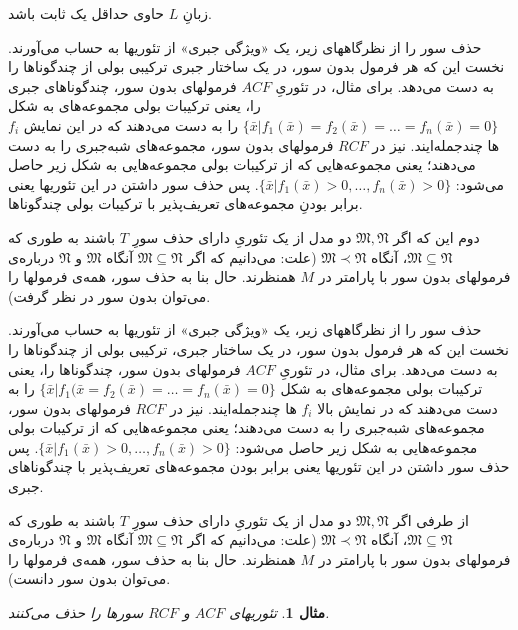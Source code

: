 \documentclass[12pt,a4paper]{report}
\theoremstyle{colorhead}
\newtheorem{mesal}[thm]{مثال}
\begin{document}
زبانِ
$L$
حاوی 
حداقل یک ثابت باشد.
\par 
حذف سور را از نظرگاههای زیر،
 یک «ویژگی جبری» از تئوریها به حساب می‌آورند.  نخست این که هر فرمول بدون سور، در یک ساختار جبری ترکیبی بولی 
 از چندگوناها 
 را به دست می‌دهد. برای مثال، در تئوریِ
  $ACF$
  فرمولهای 
  بدون سور، چندگوناهای جبری را، یعنی ترکیبات بولی مجموعه‌های به شکل
  $\{\bar{x}|f_1(\bar{x})=f_2(\bar{x})=\ldots=f_n(\bar{x})=0\}$
   را به دست می‌دهند که در این نمایش
  $f_i$
  ها چندجمله‌ایند. 
  نیز در
  $RCF$
  فرمولهای بدون سور، 
  مجموعه‌های شبه‌جبری 
  را به دست می‌دهند؛ یعنی مجموعه‌هایی که از ترکیبات بولی مجموعه‌هایی به شکل زیر حاصل می‌شود:
  $\{\bar{x}|f_1(\bar{x})>0, \ldots, f_n(\bar{x})>0\}$.
  پس 
  حذف سور داشتن در این تئوریها یعنی برابر بودنِ مجموعه‌های تعریف‌پذیر با 
  ترکیبات بولی چندگوناها. 
  \par 
 دوم این که اگر
  $\mathfrak{M},\mathfrak{N}$
  دو
  مدل از یک تئوریِ دارای حذف سورِ
  $T$
  باشند به طوری که
  $\mathfrak{M}\subseteq \mathfrak{N}$،
  آنگاه
  $\mathfrak{M}\prec \mathfrak{N}$
  (علت: می‌دانیم که اگر
  $\mathfrak{M}\subseteq \mathfrak{N}$
  آنگاه 
  $\mathfrak{M}$
  و
  $\mathfrak{N}$
  درباره‌ی 
  فرمولهای بدون سور با پارامتر در
  $M$
  همنظرند. حال
  بنا به حذف سور، همه‌ی فرمولها را می‌توان بدون سور در نظر گرفت).
\par 
حذف سور را از نظرگاههای زیر،
 یک «ویژگی جبری» از تئوریها به حساب می‌آورند.  نخست این که هر فرمول بدون سور، در یک ساختار جبری، ترکیبی بولی 
 از چندگوناها را به دست می‌دهد. برای مثال، در تئوریِ
  $ACF$
  فرمولهای 
  بدون سور، چندگوناها را، یعنی ترکیبات بولی مجموعه‌های به شکل
  $\{\bar{x}|f_1(\bar{x}=f_2(\bar{x})=\ldots=f_n(\bar{x})=0\}$
   را به دست می‌دهند که در نمایش بالا
  $f_i$
  ها چندجمله‌ایند. 
  نیز در
  $RCF$
  فرمولهای بدون سور، 
  مجموعه‌های شبه‌جبری را به دست می‌دهند؛ یعنی مجموعه‌هایی که از ترکیبات بولی مجموعه‌هایی به شکل زیر حاصل می‌شود:
  $\{\bar{x}|f_1(\bar{x})>0, \ldots, f_n(\bar{x})>0\}$.
  پس 
  حذف سور داشتن در این تئوریها یعنی برابر بودن مجموعه‌های تعریف‌پذیر با چندگوناهای جبری.
  \par 
  از طرفی اگر
  $\mathfrak{M},\mathfrak{N}$
  دو
  مدل از یک تئوریِ دارای حذف سورِ
  $T$
  باشند به طوری که
  $\mathfrak{M}\subseteq \mathfrak{N}$،
  آنگاه
  $\mathfrak{M}\prec \mathfrak{N}$
  (علت: می‌دانیم که اگر
  $\mathfrak{M}\subseteq \mathfrak{N}$
  آنگاه 
  $\mathfrak{M}$
  و
  $\mathfrak{N}$
  درباره‌ی 
  فرمولهای بدون سور با پارامتر در
  $M$
  همنظرند. حال
  بنا به حذف سور، همه‌ی فرمولها را می‌توان بدون سور دانست).
  \begin{mesal}
  تئوریهای
  $ACF$
  و
  $RCF$
  سورها را حذف می‌کنند.
  \end{mesal}
\end{document}
